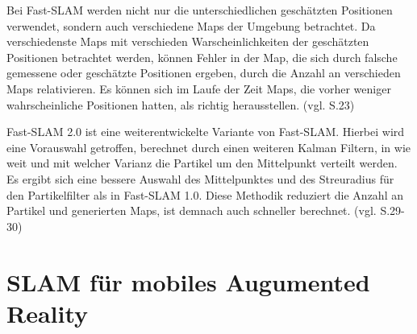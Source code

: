 Bei Fast-SLAM werden nicht nur die unterschiedlichen geschätzten Positionen verwendet, sondern auch verschiedene Maps der Umgebung betrachtet. Da verschiedenste Maps mit verschieden Warscheinlichkeiten der geschätzten Positionen betrachtet werden, können Fehler in der Map, die sich durch falsche gemessene oder geschätzte Positionen ergeben, durch die Anzahl an verschieden Maps relativieren. Es können sich im Laufe der Zeit Maps, die vorher weniger wahrscheinliche Positionen hatten, als richtig herausstellen. (vgl.  \cite{slam_studi} S.23)

Fast-SLAM 2.0 ist eine weiterentwickelte Variante von Fast-SLAM. Hierbei wird eine Vorauswahl getroffen, berechnet durch einen weiteren Kalman Filtern, in wie weit und mit welcher Varianz die Partikel um den Mittelpunkt verteilt werden. Es ergibt sich eine bessere Auswahl des Mittelpunktes und des Streuradius für den Partikelfilter als in Fast-SLAM 1.0. Diese Methodik reduziert die Anzahl an Partikel und generierten Maps, ist demnach auch schneller berechnet. (vgl. \cite{slam_studi} S.29-30)




\section{SLAM für mobiles Augumented Reality}

